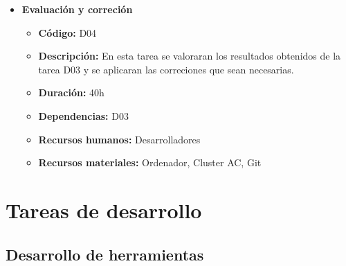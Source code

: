 \begin{itemize}
\begin{itemize}
        \end{itemize}
    \item \textbf{Evaluación y correción}
        \begin{itemize}
            \item \textbf{Código:} D04
            \item \textbf{Descripción:} En esta tarea se valoraran los resultados obtenidos de la tarea D03 y se aplicaran las correciones que sean 
                necesarias.
            \item \textbf{Duración:} 40h
            \item \textbf{Dependencias:} D03
            \item \textbf{Recursos humanos:} Desarrolladores
            \item \textbf{Recursos materiales:} Ordenador, Cluster AC, Git
        \end{itemize}
\end{itemize}

\section{Tareas de desarrollo}
\label{sec:tareas_desarrollo}

\subsection{Desarrollo de herramientas}
\label{subsec:tareas_herramientas}

